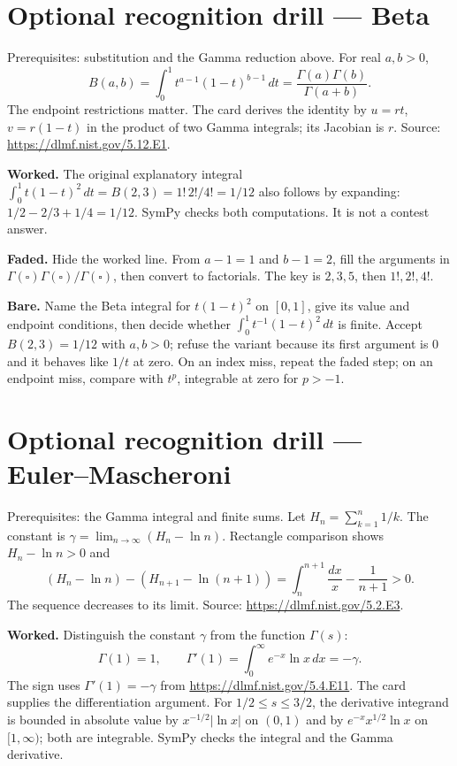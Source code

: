 \section{Optional recognition drill --- Beta}
Prerequisites: substitution and the Gamma reduction above. For real $a,b>0$,
\[
B(a,b)=\int_0^1 t^{a-1}(1-t)^{b-1}\,dt
=\frac{\Gamma(a)\Gamma(b)}{\Gamma(a+b)}.
\]
The endpoint restrictions matter. The card  derives the identity by $u=rt$, $v=r(1-t)$ in the product of two Gamma integrals; its Jacobian is $r$. Source: \url{https://dlmf.nist.gov/5.12.E1}.

\textbf{Worked.} The original explanatory integral
$\int_0^1 t(1-t)^2\,dt=B(2,3)=1!\,2!/4!=1/12$ also follows by expanding: $1/2-2/3+1/4=1/12$. SymPy checks both computations. It is not a contest answer.

\textbf{Faded.} Hide the worked line. From $a-1=1$ and $b-1=2$, fill the arguments in $\Gamma(\square)\Gamma(\square)/\Gamma(\square)$, then convert to factorials. The key is $2,3,5$, then $1!,2!,4!$.

\textbf{Bare.} Name the Beta integral for $t(1-t)^2$ on $[0,1]$, give its value and endpoint conditions, then decide whether $\int_0^1 t^{-1}(1-t)^2\,dt$ is finite. Accept $B(2,3)=1/12$ with $a,b>0$; refuse the variant because its first argument is 0 and it behaves like $1/t$ at zero. On an index miss, repeat the faded step; on an endpoint miss, compare with $t^p$, integrable at zero for $p>-1$.

\section{Optional recognition drill --- Euler--Mascheroni}
Prerequisites: the Gamma integral and finite sums. Let $H_n=\sum_{k=1}^n1/k$. The constant is $\gamma=\lim_{n\to\infty}(H_n-\ln n)$. Rectangle comparison shows $H_n-\ln n>0$ and
\[
(H_n-\ln n)-(H_{n+1}-\ln(n+1))
=\int_n^{n+1}\frac{dx}{x}-\frac1{n+1}>0.
\]
The sequence decreases to its limit. Source: \url{https://dlmf.nist.gov/5.2.E3}.

\textbf{Worked.} Distinguish the constant $\gamma$ from the function $\Gamma(s)$:
\[
\Gamma(1)=1,\qquad
\Gamma'(1)=\int_0^\infty e^{-x}\ln x\,dx=-\gamma.
\]
The sign uses $\Gamma'(1)=-\gamma$ from \url{https://dlmf.nist.gov/5.4.E11}. The card  supplies the differentiation argument. For $1/2\le s\le3/2$, the derivative integrand is bounded in absolute value by $x^{-1/2}|\ln x|$ on $(0,1)$ and by $e^{-x}x^{1/2}\ln x$ on $[1,\infty)$; both are integrable. SymPy checks the integral and the Gamma derivative.

